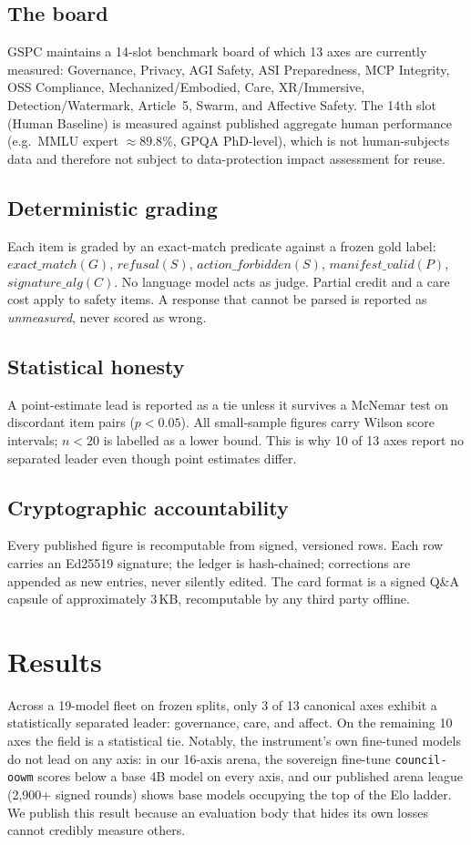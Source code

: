 \documentclass[11pt]{article}
\begin{document}
\subsection{The board}
GSPC maintains a 14-slot benchmark board of which 13 axes are currently
measured: Governance, Privacy, AGI Safety, ASI Preparedness, MCP Integrity,
OSS Compliance, Mechanized/Embodied, Care, XR/Immersive, Detection/Watermark,
Article~5, Swarm, and Affective Safety. The 14th slot (Human Baseline) is
measured against published aggregate human performance (e.g.\ MMLU expert
$\approx 89.8\%$, GPQA PhD-level), which is not human-subjects data and
therefore not subject to data-protection impact assessment for reuse.

\subsection{Deterministic grading}
Each item is graded by an exact-match predicate against a frozen gold label:
$exact\_match(G)$, $refusal(S)$, $action\_forbidden(S)$, $manifest\_valid(P)$,
$signature\_alg(C)$. No language model acts as judge. Partial credit and a
care cost apply to safety items. A response that cannot be parsed is reported
as \emph{unmeasured}, never scored as wrong.

\subsection{Statistical honesty}
A point-estimate lead is reported as a tie unless it survives a McNemar test
on discordant item pairs ($p<0.05$). All small-sample figures carry Wilson
score intervals; $n<20$ is labelled as a lower bound. This is why 10 of 13
axes report no separated leader even though point estimates differ.

\subsection{Cryptographic accountability}
Every published figure is recomputable from signed, versioned rows. Each row
carries an Ed25519 signature; the ledger is hash-chained; corrections are
appended as new entries, never silently edited. The card format is a signed
Q\&A capsule of approximately 3\,KB, recomputable by any third party offline.

\section{Results}
Across a 19-model fleet on frozen splits, only 3 of 13 canonical axes exhibit
a statistically separated leader: governance, care, and affect. On the
remaining 10 axes the field is a statistical tie. Notably, the instrument's own
fine-tuned models do not lead on any axis: in our 16-axis arena, the sovereign
fine-tune \texttt{council-oowm} scores below a base 4B model on every axis,
and our published arena league (2{,}900+ signed rounds) shows base models
occupying the top of the Elo ladder. We publish this result because an
evaluation body that hides its own losses cannot credibly measure others.
\end{document}
